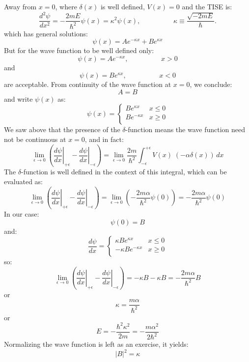 \documentclass[12pt]{book}
\begin{document}
Away from $x=0$, where $\delta(x)$ is well defined, $V(x)=0$ and the TISE is:
\begin{equation*}
\frac{d^2 \psi}{d x^2} = -\frac{2mE}{\hbar^2}\psi(x) = \kappa^2 \psi(x), \hspace{2cm} \kappa \equiv \frac{\sqrt{-2mE}}{\hbar}.
\end{equation*}
which has general solutions:
$$\psi(x) = A e^{\displaystyle - \kappa x} + B e^{\displaystyle \kappa x}$$
But for the wave function to be well defined only:
$$\psi(x) = A e^{\displaystyle - \kappa x}, \hspace{2cm} x>0$$ 
and
$$\psi(x) = B e^{\displaystyle \kappa x}, \hspace{2cm} x<0$$
are acceptable.  From continuity of the wave function at $x=0$, we conclude:
$$A=B$$
and write $\psi(x)$ as:
$$\psi(x) = \begin{cases}
B e^{\displaystyle \kappa x} &  x\leq0 \\
B e^{\displaystyle -\kappa x} &  x\geq0 \\
\end{cases}
$$
We saw above that the presence of the $\delta$-function means the wave function need not be continuous at $x=0$, and in fact:
$$
\lim_{\epsilon \to 0} \left( \left. \frac{d\psi}{d x} \right\rvert_{+\epsilon} 
- \left. \frac{d\psi}{d x} \right\rvert_{-\epsilon} \right) = 
\lim_{\epsilon \to 0}
\frac{2m}{\hbar^2}\int_{-\epsilon}^{+\epsilon} V(x) \; \left( -\alpha \delta(x) \right) \, dx
$$
The $\delta$-function is well defined in the context of this integral, which can be evaluated as:
$$
\lim_{\epsilon \to 0} \left( \left. \frac{d\psi}{d x} \right\rvert_{+\epsilon} 
- \left. \frac{d\psi}{d x} \right\rvert_{-\epsilon} \right) = 
\lim_{\epsilon \to 0} \left( -\frac{2m\alpha}{\hbar^2} \psi(0) \right) = -\frac{2m\alpha}{\hbar^2} \psi(0) 
$$
In our case:
$$\psi(0) = B$$
and:
$$\frac{d\psi}{dx} = \begin{cases}
\kappa B e^{\displaystyle \kappa x} &  x\leq0 \\
-\kappa B e^{\displaystyle -\kappa x} &  x\geq0 \\
\end{cases}
$$
so:
$$
\lim_{\epsilon \to 0} \left( \left. \frac{d\psi}{d x} \right\rvert_{+\epsilon} 
- \left. \frac{d\psi}{d x} \right\rvert_{-\epsilon} \right) = -\kappa B - \kappa B = 
-\frac{2m\alpha}{\hbar^2} B 
$$
or
$$\kappa = \frac{m\alpha}{\hbar^2}$$
or
$$E = -\frac{\hbar^2 \kappa^2}{2m} = - \frac{m\alpha^2}{2\hbar^2}$$
Normalizing the wave function is left as an exercise, it yields:
$$|B|^2 = \kappa$$
\end{document}

